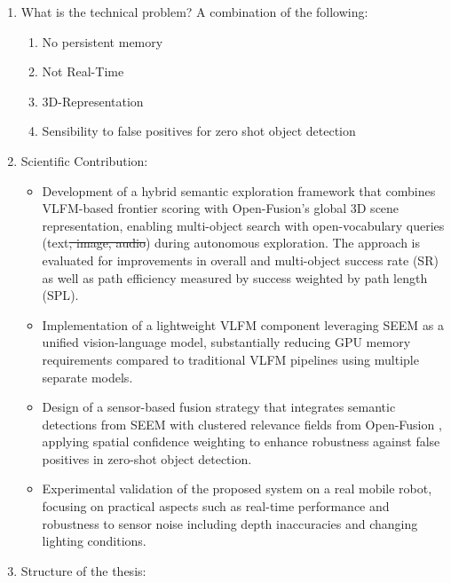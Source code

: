 \begin{enumerate}
    \item What is the technical problem? A combination of the following:
    \begin{enumerate}
        \item No persistent memory
        \item Not Real-Time
        \item 3D-Representation
        \item Sensibility to false positives for zero shot object detection
    \end{enumerate}
    \item Scientific Contribution:
    \begin{itemize}
        \item Development of a hybrid semantic exploration framework that combines \ac{VLFM}-based \cite{yokoyama2024vlfm} frontier scoring with Open-Fusion's \cite{kashu2023openfusion} global 3D scene representation, enabling multi-object search with open-vocabulary queries (text\sout{, image, audio}) during autonomous exploration. The approach is evaluated for improvements in overall and multi-object success rate (\ac{SR}) as well as path efficiency measured by success weighted by path length (\ac{SPL}).
        \item Implementation of a lightweight \ac{VLFM} \cite{yokoyama2024vlfm} component leveraging \ac{SEEM} \cite{zou2023seem} as a unified vision-language model, substantially reducing GPU memory requirements compared to traditional \ac{VLFM} \cite{yokoyama2024vlfm} pipelines using multiple separate models.
        \item Design of a sensor-based fusion strategy that integrates semantic detections from \ac{SEEM} \cite{zou2023seem} with clustered relevance fields from Open-Fusion \cite{kashu2023openfusion}, applying spatial confidence weighting to enhance robustness against false positives in zero-shot object detection.
        \item Experimental validation of the proposed system on a real mobile robot, focusing on practical aspects such as real-time performance and robustness to sensor noise including depth inaccuracies and changing lighting conditions.
    \end{itemize}

    \item Structure of the thesis:
\end{enumerate}
